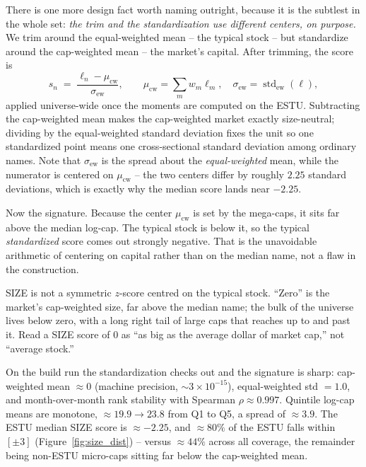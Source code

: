 \documentclass[11pt]{article}
\theoremstyle{definition}
\theoremstyle{plain}
\theoremstyle{remark}
\DeclareMathOperator{\std}{std}
\begin{document}
There is one more design fact worth naming outright, because it is the subtlest in the whole set: \emph{the trim and the standardization use different centers, on purpose.} We trim around the equal-weighted mean -- the typical stock -- but standardize around the cap-weighted mean -- the market's capital. After trimming, the score is
\[
s_n \;=\; \frac{\ell_n - \mu_{\mathrm{cw}}}{\sigma_{\mathrm{ew}}},
\qquad
\mu_{\mathrm{cw}} = \sum_{m} w_m \ell_m,
\quad
\sigma_{\mathrm{ew}} = \std\nolimits_{\mathrm{ew}}(\ell),
\]
applied universe-wide once the moments are computed on the ESTU. Subtracting the cap-weighted mean makes the cap-weighted market exactly size-neutral; dividing by the equal-weighted standard deviation fixes the unit so one standardized point means one cross-sectional standard deviation among ordinary names. Note that $\sigma_{\mathrm{ew}}$ is the spread about the \emph{equal-weighted} mean, while the numerator is centered on $\mu_{\mathrm{cw}}$ -- the two centers differ by roughly $2.25$ standard deviations, which is exactly why the median score lands near $-2.25$.

Now the signature. Because the center $\mu_{\mathrm{cw}}$ is set by the mega-caps, it sits far above the median log-cap. The typical stock is below it, so the typical \emph{standardized} score comes out strongly negative. That is the unavoidable arithmetic of centering on capital rather than on the median name, not a flaw in the construction.

\begin{intuition}
SIZE is not a symmetric $z$-score centred on the typical stock. ``Zero'' is the market's cap-weighted size, far above the median name; the bulk of the universe lives below zero, with a long right tail of large caps that reaches up to and past it. Read a SIZE score of $0$ as ``as big as the average dollar of market cap,'' not ``average stock.''
\end{intuition}

\begin{observed}
On the build run the standardization checks out and the signature is sharp: cap-weighted mean $\approx 0$ (machine precision, $\sim3\times10^{-15}$), equal-weighted std $= 1.0$, and month-over-month rank stability with Spearman $\rho \approx 0.997$. Quintile log-cap means are monotone, $\approx 19.9 \to 23.8$ from Q1 to Q5, a spread of $\approx 3.9$. The ESTU median SIZE score is $\approx -2.25$, and $\approx 80\%$ of the ESTU falls within $[\pm 3]$ (Figure~\ref{fig:size_dist}) -- versus $\approx 44\%$ across all coverage, the remainder being non-ESTU micro-caps sitting far below the cap-weighted mean.
\end{observed}
\end{document}
